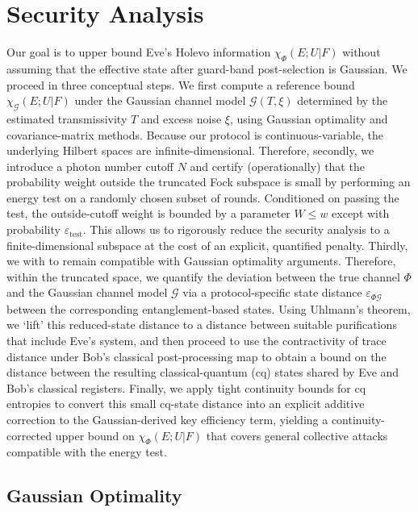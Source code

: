 ﻿\documentclass[12pt]{article}
\begin{document}
\section{Security Analysis}\label{sec: security proof}

Our goal is to upper bound Eve's Holevo information $\chi_\Phi(E;U|F)$ without assuming that the effective state after guard-band post-selection is Gaussian. We proceed in three conceptual steps. We first compute a reference bound $\chi_\mathcal{G}(E;U|F)$ under the Gaussian channel model $\mathcal{G}(T,\xi)$ determined by the estimated transmissivity $T$ and excess noise $\xi$, using Gaussian optimality and covariance-matrix methods. Because our protocol is continuous-variable, the underlying Hilbert spaces are infinite-dimensional. Therefore, secondly, we introduce a photon number cutoff $N$ and certify (operationally) that the probability weight outside the truncated Fock subspace is small by performing an energy test on a randomly chosen subset of rounds. Conditioned on passing the test, the outside-cutoff weight is bounded by a parameter $W \le w$ except with probability $\varepsilon_{\mathrm{test}}$. This allows us to rigorously reduce the security analysis to a finite-dimensional subspace at the cost of an explicit, quantified penalty. Thirdly, we with to remain compatible with Gaussian optimality arguments. Therefore, within the truncated space, we quantify the deviation between the true channel $\Phi$ and the Gaussian channel model $\mathcal{G}$ via a protocol-specific state distance $\varepsilon_{\Phi \mathcal{G}}$ between the corresponding entanglement-based states. Using Uhlmann's theorem, we `lift' this reduced-state distance to a distance between suitable purifications that include Eve's system, and then proceed to use the contractivity of trace distance under Bob's classical post-processing map to obtain a bound on the distance between the resulting classical-quantum (cq) states shared by Eve and Bob's classical registers. Finally, we apply tight continuity bounds for cq entropies to convert this small cq-state distance into an explicit additive correction to the Gaussian-derived key efficiency term, yielding a continuity-corrected upper bound on $\chi_\Phi(E;U|F)$ that covers general collective attacks compatible with the energy test.

\subsection{Gaussian Optimality}\label{subsec: gaussian optimality}
\end{document}
